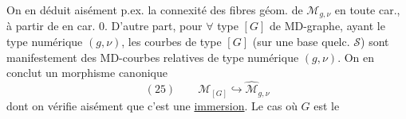 
On en déduit aisément p.ex. la connexité des fibres géom. de $\mathcal M_{g,\nu}$ en toute car., à partir de   en car. $0$. D'autre part, pour $\forall$ type $[G]$ de MD-graphe, ayant le type numérique $(g,\nu)$, les courbes  de type $[G]$ (sur une base quelc. $\mathcal S$) sont manifestement des MD-courbes relatives de type numérique $(g,\nu)$. On en conclut un morphisme canonique
\[
(25)\qquad\mathcal M_{[G]}\hookrightarrow\widehat{\mathcal M}_{g,\nu}
\]
dont on vérifie aisément que c'est une \uline{immersion}. Le cas où $G$ est le
